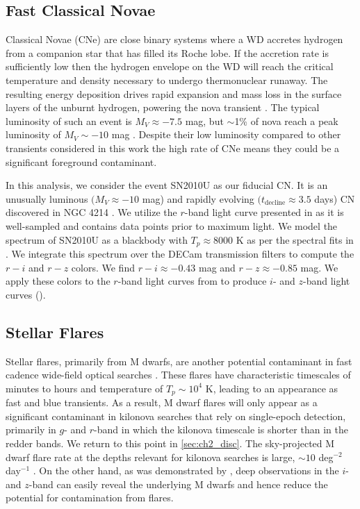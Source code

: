 \subsection{Fast Classical Novae}
\label{sec:ch2_fastnovae}
Classical Novae (CNe) are close binary systems where a WD accretes hydrogen from a companion star that has filled its Roche lobe. If the accretion rate is sufficiently low then the hydrogen envelope on the WD will reach the critical temperature and density necessary to undergo thermonuclear runaway. The resulting energy deposition drives rapid expansion and mass loss in the surface layers of the unburnt hydrogen, powering the nova transient \citep{Warner2003}. The typical luminosity of such an event is $M_V \approx -7.5$ mag, but $\sim$1\% of nova reach a peak luminosity of $M_V \sim -10$ mag \citep{Shafter+09}. Despite their low luminosity compared to other transients considered in this work the high rate of CNe \citep[$\sim 35$ yr$^{-1}$ per MW/M31 type galaxy,][]{Darnley+06, Shafter+11} means they could be a significant foreground contaminant. 

In this analysis, we consider the event SN2010U as our fiducial CN. It is an unusually luminous $(M_V \approx -10$ mag) and rapidly evolving $(t_{\text{decline}} \approx 3.5$ days) CN discovered in NGC 4214 \citep{NakanoKadota10,Czekala+13}. We utilize the $r$-band light curve presented in \citet{Czekala+13} as it is well-sampled and contains data points prior to maximum light. We model the spectrum of SN2010U as a blackbody with $T_p \approx 8000$ K as per the spectral fits in \citet{Czekala+13}. We integrate this spectrum over the DECam transmission filters to compute the $r-i$ and $r-z$ colors. We find $r-i \approx -0.43$ mag and $r-z \approx -0.85$ mag. We apply these colors to the $r$-band light curves from \citet{Czekala+13} to produce $i$- and $z$-band light curves ().

\subsection{Stellar Flares}
\label{sec:ch2_flarestar}
Stellar flares, primarily from M dwarfs, are another potential contaminant in fast cadence wide-field optical searches \citep{Becker+04,KulkarniRau06,Berger+13}.  These flares have characteristic timescales of minutes to hours \citep[see e.g.,][]{Berger+13} and temperature of $T_p \sim 10^4$ K, leading to an appearance as fast and blue transients.  As a result, M dwarf flares will only appear as a significant contaminant in kilonova searches that rely on single-epoch detection, primarily in $g$- and $r$-band in which the kilonova timescale is shorter than in the redder bands.  We return to this point in \cref{sec:ch2_disc}.  The sky-projected M dwarf flare rate at the depths relevant for kilonova searches is large, $\sim 10$ deg$^{-2}$ day$^{-1}$ \citep{KulkarniRau06}.  On the other hand, as was demonstrated by \citet{Berger+13}, deep observations in the $i$- and $z$-band can easily reveal the underlying M dwarfs and hence reduce the potential for contamination from flares.

